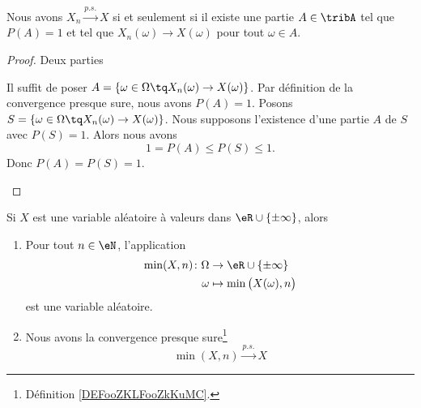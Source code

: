 \begin{lemma}       \label{LEMooADHZooGCxVvn}
	Nous avons \( X_n\stackrel{p.s.}{\longrightarrow}X\) si et seulement si il existe une partie \( A\in\tribA\) tel que \( P(A)=1\) et tel que \( X_n(\omega)\to X(\omega)\) pour tout \( \omega\in A\).
\end{lemma}

\begin{proof}
	Deux parties
	\begin{subproof}
		\spitem[\( \Rightarrow\)]
		Il suffit de poser \( A=\{ \omega\in\Omega\tq X_n(\omega)\to X(\omega) \}\). Par définition de la convergence presque sure, nous avons \( P(A)=1\).
		\spitem[\( \Leftarrow\)]
		Posons \( S=\{ \omega\in\Omega\tq X_n(\omega)\to X(\omega) \}\). Nous supposons l'existence d'une partie \( A\) de \( S\) avec \( P(S)=1\). Alors nous avons
		\begin{equation}
			1=P(A)\leq P(S)\leq 1.
		\end{equation}
		Donc \( P(A)=P(S)=1\).
	\end{subproof}
\end{proof}

\begin{lemma}       \label{LEMooNTNIooKbLwgX} Si \( X\) est une variable aléatoire à valeurs dans \( \eR\cup\{ \pm\infty \}\), alors
	\begin{enumerate}
		\item
		      Pour tout \( n\in \eN\), l'application
		      \begin{equation}
			      \begin{aligned}
				      \min(X,n)\colon \Omega & \to \eR\cup\{ \pm\infty \}          \\
				      \omega                 & \mapsto \min\big( X(\omega),n \big)
			      \end{aligned}
		      \end{equation}
		      est une variable aléatoire.
		\item
		      Nous avons la convergence presque sure\footnote{Définition \ref{DEFooZKLFooZkKuMC}.}
		      \begin{equation}
			      \min(X,n)\stackrel{p.s.}{\longrightarrow}X
		      \end{equation}
	\end{enumerate}
\end{lemma}

